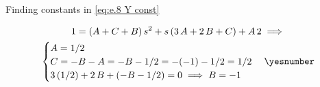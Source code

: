 \documentclass["AM3C-Slides_annotations.tex"]{subfiles}
\begin{document}
\begin{exampleBox}
  Finding constants in \eqref{eq:e.8 Y const}
  \begin{tcolorbox}
    \begin{gather*}
      1
      = (A+C+B)\,s^2
      + s\,(3\,A+2\,B+C)
      + A\,2
      \implies \\
      \begin{cases}
        A = 1/2
        \\
        C = -B-A = -B-1/2 = -(-1)-1/2 = 1/2
        \\
        3\,(1/2)+2\,B+(-B-1/2) = 0
        \implies
        B = -1
      \end{cases}
      \yesnumber\label{eq:e.8 const of Y}
    \end{gather*}
  \end{tcolorbox}


\end{exampleBox}
\end{document}
